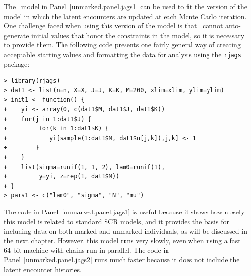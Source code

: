 The \jags~model in Panel~\ref{unmarked.panel.jags1} can be used to
fit the version of the model in which the latent encounters are
updated at each Monte Carlo iteration. One challenge faced when using
this version of the model is that \jags~cannot auto-generate initial values
that honor the constraints in the model, so it is necessary to provide
them. The following code presents one fairly general way of creating
acceptable starting values and formatting the data for analysis using
the \texttt{rjags} package:
\begin{small}
\begin{verbatim}
> library(rjags)
> dat1 <- list(n=n, X=X, J=J, K=K, M=200, xlim=xlim, ylim=ylim)
> init1 <- function() {
+    yi <- array(0, c(dat1$M, dat1$J, dat1$K))
+    for(j in 1:dat1$J) {
+         for(k in 1:dat1$K) {
+            yi[sample(1:dat1$M, dat1$n[j,k]),j,k] <- 1
+        }
+    }
+    list(sigma=runif(1, 1, 2), lam0=runif(1),
+         y=yi, z=rep(1, dat1$M))
+ }
> pars1 <- c("lam0", "sigma", "N", "mu")
\end{verbatim}
\end{small}

The code in Panel~\ref{unmarked.panel.jags1} %
is useful because it shows how
closely this model is related to standard SCR models, and it provides
the basis for including data on both marked and unmarked individuals,
as will be discussed in the next chapter. However, this model runs
very slowly, even when using a fast 64-bit machine with chains run in parallel. The code
in Panel~\ref{unmarked.panel.jags2} runs much faster because it
does not include the latent encounter histories. %

